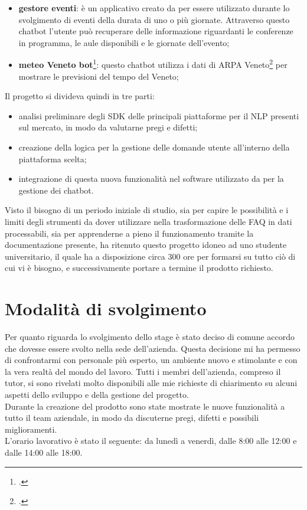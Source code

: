 \begin{itemize}
	\item \textbf{gestore eventi}: è un applicativo creato da \azienda{} per essere utilizzato durante lo svolgimento di eventi della durata di uno o più giornate. Attraverso questo \gls{chatbot} l'utente può recuperare delle informazione riguardanti le conferenze in programma, le aule disponibili e le giornate dell'evento;
	\item \textbf{meteo Veneto bot}\footcite{meteo}: questo \gls{chatbot} utilizza i dati di ARPA Veneto\footcite{arpav} per mostrare le previsioni del tempo del Veneto;
\end{itemize}
Il progetto si divideva quindi in tre parti:
\begin{itemize}
	\item analisi preliminare degli \gls{SDK} delle principali piattaforme per il \gls{NLP} presenti sul mercato, in modo da valutarne pregi e difetti;
	\item creazione della logica per la gestione delle domande utente all'interno della piattaforma scelta;
	\item integrazione di questa nuova funzionalità nel software utilizzato da \azienda{} per la gestione dei \gls{chatbot}. 
\end{itemize}
Visto il bisogno di un periodo iniziale di studio, sia per capire le possibilità e i limiti degli strumenti da dover utilizzare nella trasformazione delle \gls{FAQ} in dati processabili, sia per apprenderne a pieno il funzionamento tramite la documentazione presente, \azienda{} ha ritenuto questo progetto idoneo ad uno studente universitario, il quale ha a disposizione circa 300 ore per formarsi su tutto ciò di cui vi è bisogno, e successivamente portare a termine il prodotto richiesto.

\section{Modalità di svolgimento}
Per quanto riguarda lo svolgimento dello stage è stato deciso di comune accordo che dovesse essere svolto nella sede dell'azienda. Questa decisione mi ha permesso di confrontarmi con personale più esperto, un ambiente nuovo e stimolante e con la vera realtà del mondo del lavoro. Tutti i membri dell'azienda, compreso il tutor, si sono rivelati molto disponibili alle mie richieste di chiarimento su alcuni aspetti dello sviluppo e della gestione del progetto.\\
Durante la creazione del prodotto sono state mostrate le nuove funzionalità a tutto il team aziendale, in modo da discuterne pregi, difetti e possibili miglioramenti. \\
L'orario lavorativo è stato il seguente: da lunedì a venerdì, dalle 8:00 alle 12:00 e dalle 14:00 alle 18:00.


